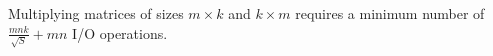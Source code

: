 %
%

\begin{thm} 
	Multiplying matrices of sizes $m \times k$ and $k \times m $ requires a 
	minimum 
	number of $\frac{mnk}{\sqrt{S}} + mn$ I/O operations.
	\label{thm:seqlowbounds}
\end{thm}

